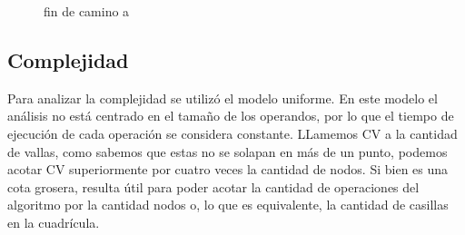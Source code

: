 \documentclass[a4paper, 12pt]{article}
\begin{document}
\begin{figure}[H]
\centering
{}
\qquad
{}
\qquad
{}
\caption{fin de camino a}
\end{figure}


\subsection*{Complejidad}
Para analizar la complejidad se utilizó el modelo uniforme. En este modelo el análisis no está centrado en el tama\~{n}o de los operandos, por lo que el tiempo de ejecución de cada operación se considera constante.
LLamemos CV a la cantidad de vallas, como sabemos que estas no se solapan en más de un punto, podemos acotar CV superiormente por cuatro veces la cantidad de nodos. Si bien es una cota grosera, resulta útil para poder acotar la cantidad de operaciones del algoritmo por la cantidad nodos o, lo que es equivalente, la cantidad de casillas en la cuadrícula.
 
\end{document}
